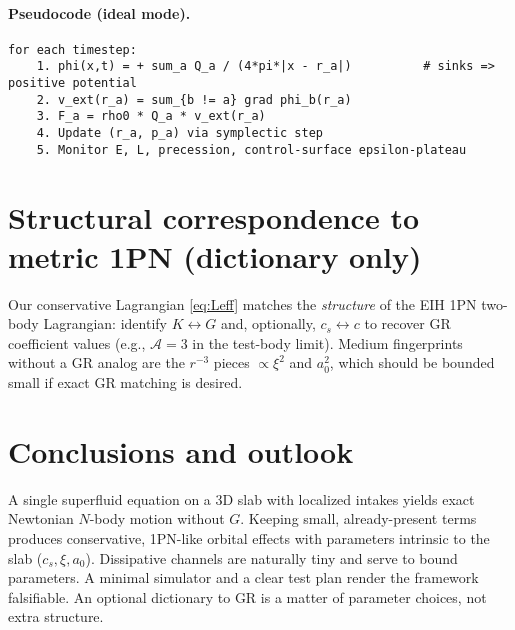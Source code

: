 \documentclass[11pt]{article}
\numberwithin{equation}{section}
\theoremstyle{plain}
\theoremstyle{remark}
\theoremstyle{definition}
\begin{document}
\paragraph{Pseudocode (ideal mode).}
\begin{verbatim}
for each timestep:
    1. phi(x,t) = + sum_a Q_a / (4*pi*|x - r_a|)          # sinks => positive potential
    2. v_ext(r_a) = sum_{b != a} grad phi_b(r_a)
    3. F_a = rho0 * Q_a * v_ext(r_a)
    4. Update (r_a, p_a) via symplectic step
    5. Monitor E, L, precession, control-surface epsilon-plateau
\end{verbatim}

\section{Structural correspondence to metric 1PN (dictionary only)}
\label{sec:dictionary}
Our conservative Lagrangian \eqref{eq:Leff} matches the \emph{structure} of the EIH 1PN two-body Lagrangian: identify $K\leftrightarrow G$ and, optionally, $c_s\leftrightarrow c$ to recover GR coefficient values (e.g., $\mathcal A=3$ in the test-body limit). Medium fingerprints without a GR analog are the $r^{-3}$ pieces $\propto \xi^2$ and $a_0^2$, which should be bounded small if exact GR matching is desired.

\section{Conclusions and outlook}
\label{sec:conclusion}
A single superfluid equation on a 3D slab with localized intakes yields exact Newtonian $N$-body motion without $G$. Keeping small, already-present terms produces conservative, 1PN-like orbital effects with parameters intrinsic to the slab ($c_s,\xi,a_0$). Dissipative channels are naturally tiny and serve to bound parameters. A minimal simulator and a clear test plan render the framework falsifiable. An optional dictionary to GR is a matter of parameter choices, not extra structure.

\appendix
\end{document}
